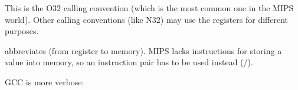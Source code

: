 This is the O32 calling convention (which is the most common one in the MIPS world).
Other calling conventions (like N32) may use the registers for different purposes.


 abbreviates  (from register to memory).
MIPS lacks instructions for storing a value into memory, so an instruction pair has to be used instead (/).






\NonOptimizing GCC is more verbose:





